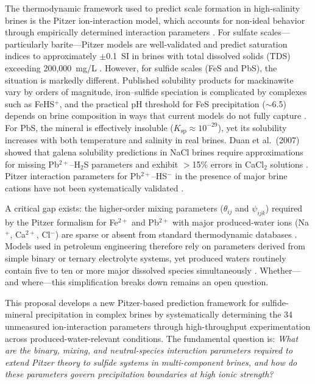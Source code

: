 \documentclass[12pt]{article}
\begin{document}
The thermodynamic framework used to predict scale formation in high-salinity brines is the Pitzer ion-interaction model, which accounts for non-ideal behavior through empirically determined interaction parameters \cite{kan2019}. For sulfate scales---particularly barite---Pitzer models are well-validated and predict saturation indices to approximately $\pm$0.1~SI in brines with total dissolved solids (TDS) exceeding 200,000~mg/L \cite{kan2019,shaferpeltier2020}. However, for sulfide scales (FeS and PbS), the situation is markedly different. Published solubility products for mackinawite vary by orders of magnitude, iron--sulfide speciation is complicated by complexes such as FeHS$^+$, and the practical pH threshold for FeS precipitation ($\sim$6.5) depends on brine composition in ways that current models do not fully capture \cite{wylde2014,wang2020}. For PbS, the mineral is effectively insoluble ($K_{\text{sp}} \approx 10^{-29}$), yet its solubility increases with both temperature and salinity in real brines. Duan et al.\ (2007) showed that galena solubility predictions in NaCl brines require approximations for missing Pb$^{2+}$--H$_2$S parameters and exhibit $>$15\% errors in CaCl$_2$ solutions \cite{duan2007}. Pitzer interaction parameters for Pb$^{2+}$--HS$^-$ in the presence of major brine cations have not been systematically validated \cite{alharbi2017,keogh2019}.

A critical gap exists: the higher-order mixing parameters ($\theta_{ij}$ and $\psi_{ijk}$) required by the Pitzer formalism for Fe$^{2+}$ and Pb$^{2+}$ with major produced-water ions (Na$^+$, Ca$^{2+}$, Cl$^-$) are sparse or absent from standard thermodynamic databases \cite{wang2020}. Models used in petroleum engineering therefore rely on parameters derived from simple binary or ternary electrolyte systems, yet produced waters routinely contain five to ten or more major dissolved species simultaneously \cite{kan2019,shaferpeltier2020}. Whether---and where---this simplification breaks down remains an open question.

This proposal develops a new Pitzer-based prediction framework for sulfide-mineral precipitation in complex brines by systematically determining the 34 unmeasured ion-interaction parameters through high-throughput experimentation across produced-water-relevant conditions. The fundamental question is: \textit{What are the binary, mixing, and neutral-species interaction parameters required to extend Pitzer theory to sulfide systems in multi-component brines, and how do these parameters govern precipitation boundaries at high ionic strength?}
\end{document}
